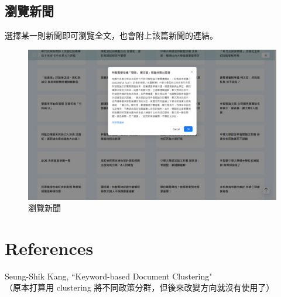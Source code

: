 \documentclass[12pt,cleanfoot,twocolumn]{asme2ej}
\begin{document}
\subsection{瀏覽新聞}
選擇某一則新聞即可瀏覽全文，也會附上該篇新聞的連結。

\begin{figure}[H]
        \includegraphics[scale=0.2]{news}
        \caption{瀏覽新聞}
\end{figure}

\section{References}
Seung-Shik Kang, ``Keyword-based Document Clustering" \\
（原本打算用 clustering 將不同政策分群，但後來改變方向就沒有使用了）
\end{document}
